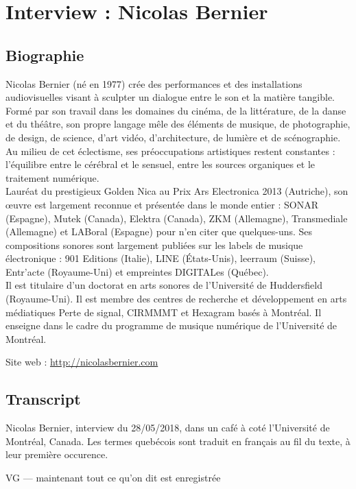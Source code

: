 \chapter{Interview : Nicolas Bernier}
\label{appendix:bernier}

\section*{Biographie}

\noindent Nicolas Bernier (né en 1977) crée des performances et des installations audiovisuelles visant à sculpter un dialogue entre le son et la matière tangible. Formé par son travail dans les domaines du cinéma, de la littérature, de la danse et du théâtre, son propre langage mêle des éléments de musique, de photographie, de design, de science, d'art vidéo, d'architecture, de lumière et de scénographie. Au milieu de cet éclectisme, ses préoccupations artistiques restent constantes : l'équilibre entre le cérébral et le sensuel, entre les sources organiques et le traitement numérique.\\
\indent Lauréat du prestigieux Golden Nica au Prix Ars Electronica 2013 (Autriche), son œuvre est largement reconnue et présentée dans le monde entier : SONAR (Espagne), Mutek (Canada), Elektra (Canada), ZKM (Allemagne), Transmediale (Allemagne) et LABoral (Espagne) pour n'en citer que quelques-uns. Ses compositions sonores sont largement publiées sur les labels de musique électronique : 901 Editions (Italie), LINE (États-Unis), leerraum (Suisse), Entr'acte (Royaume-Uni) et empreintes DIGITALes (Québec).\\
\indent Il est titulaire d'un doctorat en arts sonores de l'Université de Huddersfield (Royaume-Uni). Il est membre des centres de recherche et développement en arts médiatiques Perte de signal, CIRMMMT et Hexagram basés à Montréal. Il enseigne dans le cadre du programme de musique numérique de l'Université de Montréal.

\noindent Site web : \url{http://nicolasbernier.com}

\section*{Transcript}

\noindent Nicolas Bernier, interview du 28/05/2018, dans un café à coté l'Université de Montréal, Canada. Les termes quebécois sont traduit en français au fil du texte, à leur première occurence.
 
VG — maintenant tout ce qu'on dit est enregistrée 

